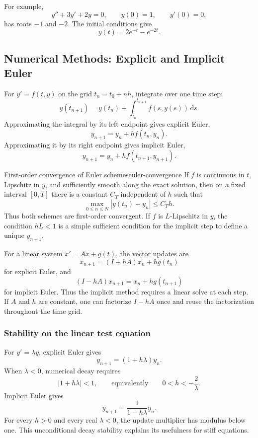 \documentclass[11pt]{article}
\newcommand{\dd}{\,\mathrm{d}}
\theoremstyle{definition}
\theoremstyle{plain}
\theoremstyle{remark}
\begin{document}
For example,
\[
y''+3y'+2y=0,
\qquad y(0)=1,
\qquad y'(0)=0,
\]
has roots $-1$ and $-2$. The initial conditions give
\[
\boxed{y(t)=2e^{-t}-e^{-2t}}.
\]

\subsection{Numerical Methods: Explicit and Implicit Euler}

For $y'=f(t,y)$ on the grid $t_n=t_0+nh$, integrate over one time step:
\[
y(t_{n+1})=y(t_n)+\int_{t_n}^{t_{n+1}}f(s,y(s))\dd s.
\]
Approximating the integral by its left endpoint gives explicit Euler,
\[
\boxed{y_{n+1}=y_n+h f(t_n,y_n)}.
\]
Approximating it by its right endpoint gives implicit Euler,
\[
\boxed{y_{n+1}=y_n+h f(t_{n+1},y_{n+1})}.
\]

\begin{keyproposition}{First-order convergence of Euler schemes}{euler-convergence}
If $f$ is continuous in $t$, Lipschitz in $y$, and sufficiently smooth along
the exact solution, then on a fixed interval $[0,T]$ there is a constant $C_T$
independent of $h$ such that
\[
\boxed{
\max_{0\leq n\leq N}|y(t_n)-y_n|\leq C_T h.
}
\]
Thus both schemes are first-order convergent. If $f$ is $L$-Lipschitz in $y$,
the condition $hL<1$ is a simple sufficient condition for the implicit step
to define a unique $y_{n+1}$.
\end{keyproposition}

For a linear system $x'=Ax+g(t)$, the vector updates are
\[
\boxed{x_{n+1}=(I+hA)x_n+h g(t_n)}
\]
for explicit Euler, and
\[
\boxed{(I-hA)x_{n+1}=x_n+h g(t_{n+1})}
\]
for implicit Euler. Thus the implicit method requires a linear solve at each
step. If $A$ and $h$ are constant, one can factorize $I-hA$ once and reuse the
factorization throughout the time grid.

\subsubsection*{Stability on the linear test equation}

For $y'=\lambda y$, explicit Euler gives
\[
y_{n+1}=(1+h\lambda)y_n.
\]
When $\lambda<0$, numerical decay requires
\[
|1+h\lambda|<1,
\qquad\text{equivalently}\qquad
0<h<-\frac{2}{\lambda}.
\]
Implicit Euler gives
\[
y_{n+1}=\frac{1}{1-h\lambda}y_n.
\]
For every $h>0$ and every real $\lambda<0$, the update multiplier has
modulus below one. This unconditional decay stability explains its usefulness
for stiff equations.
\end{document}
